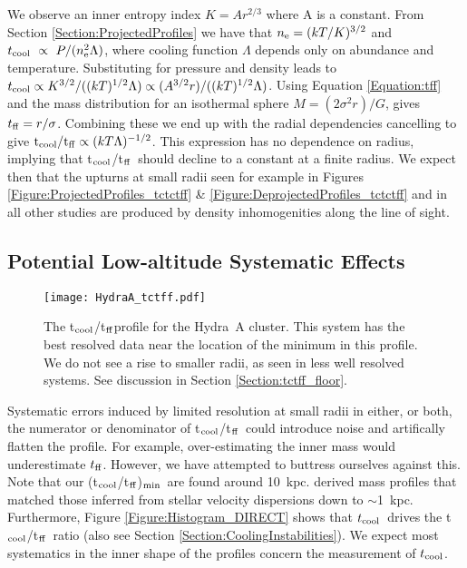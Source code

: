\documentclass[twocolumn]{aastex6}
\newcommand{\tctff}{{t$_{\rm cool}$/t$_{\rm ff}$}}
\newcommand{\tctffmin}{(\tctff)$_{\rm min}$}
\newcommand{\tc}{$t_{\rm cool}$}
\newcommand{\tff}{$t_{\rm ff}$}
\begin{document}
We observe an inner entropy index $K=Ar^{2/3}$ where A is a constant. From Section \ref{Section:ProjectedProfiles} we have that $n_{\rm e}=(kT/K)^{3/2}$ and $t_{\rm cool}~\propto~P/(n_{\rm e}^{2}\Lambda)$, where cooling function $\Lambda$ depends only on abundance and temperature.  Substituting for pressure and density leads to $t_{\rm cool} \propto K^{3/2}/((kT)^{1/2}\Lambda) \propto (A^{3/2} r)/((kT)^{1/2} \Lambda)$. Using Equation \ref{Equation:tff} and the mass distribution for an isothermal sphere $M=(2\sigma^{2}r)/G$, gives $t_{\rm ff} = r / \sigma $.  Combining these we end up with the radial dependencies cancelling to give ${\rm t}_{\rm cool}/{\rm t}_{\rm ff} \propto (kT \Lambda)^{-1/2}$.  This expression has no dependence on radius, implying that \tctff\ should decline to a constant at a finite radius.  We expect then that the upturns at small radii seen for example in Figures \ref{Figure:ProjectedProfiles_tctctff} \& \ref{Figure:DeprojectedProfiles_tctctff} and in all other studies are produced by density inhomogenities along the line of sight.   

\subsection{Potential Low-altitude Systematic Effects}

\begin{figure}
	\texttt{[image: HydraA\_tctff.pdf]}
    \caption{The \tctff profile for the Hydra~A cluster.  This system has the best resolved data near the location of the minimum in this profile.  We do not see a rise to smaller radii, as seen in less well resolved systems.  See discussion in Section \ref{Section:tctff_floor}.}
    \label{Figure:HydraA_tctff}
\end{figure}

Systematic errors induced by limited resolution at small radii in either, or both, the numerator or denominator of \tctff\ could introduce noise and artifically flatten the profile.  For example, over-estimating the inner mass would underestimate \tff.  However, we have attempted to buttress ourselves against this.  Note that our \tctffmin\ are found around 10~kpc.  \citet[][]{Hogan17} derived mass profiles that matched those inferred from stellar velocity dispersions \cite[][]{Fisher95} down to $\sim$1~kpc.  Furthermore, Figure \ref{Figure:Histogram_DIRECT} shows that \tc\ drives the \tctff\ ratio (also see Section \ref{Section:CoolingInstabilities}). We expect most systematics in the inner shape of the profiles concern the measurement of \tc. 
\end{document}
